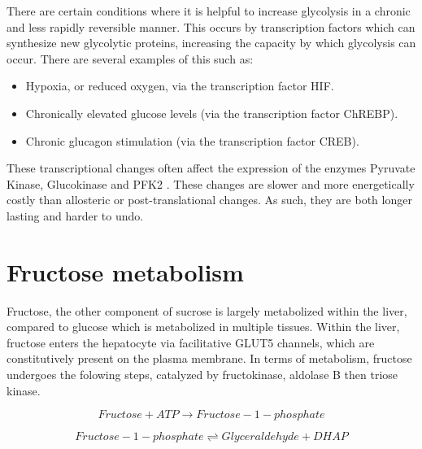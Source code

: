 \documentclass{tufte-handout}
\begin{document}
  There are certain conditions where it is helpful to increase glycolysis in a chronic and less rapidly reversible manner.  This occurs by transcription factors which can synthesize new glycolytic proteins, increasing the capacity by which glycolysis can occur.  There are several examples of this such as:

\begin{itemize}
\item Hypoxia, or reduced oxygen, via the transcription factor HIF.
\item Chronically elevated glucose levels (via the transcription factor ChREBP).    
\item Chronic glucagon stimulation (via the transcription factor CREB).
\end{itemize}

These transcriptional changes often affect the expression of the enzymes Pyruvate Kinase, Glucokinase and PFK2 \citep{Semenza1994,Kawaguchi2001}.  These changes are slower and more energetically costly than allosteric or post-translational changes.  As such, they are both longer lasting and harder to undo.

\section{Fructose metabolism}

Fructose, the other component of sucrose is largely metabolized within the liver, compared to glucose which is metabolized in multiple tissues.  Within the liver, fructose enters the hepatocyte via facilitative GLUT5 channels, which are constitutively present on the plasma membrane.  In terms of metabolism, fructose undergoes the folowing steps, catalyzed by fructokinase, aldolase B then triose kinase.

\begin{equation}
Fructose + ATP \rightarrow Fructose-1-phosphate
\end{equation}

\begin{equation}\label{eq:aldolase}
Fructose-1-phosphate \rightleftharpoons Glyceraldehyde + DHAP
\end{equation}
\end{document}
